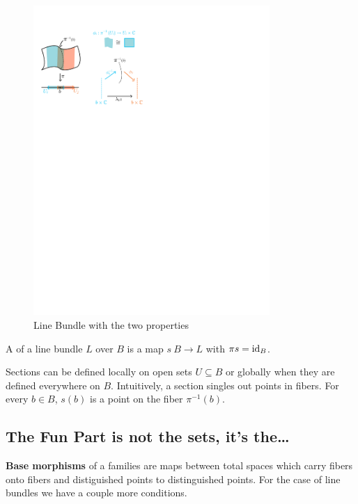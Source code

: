 \documentclass[12pt]{memoir}
\begin{document}
\begin{figure}[h!]
    \centering
    \includegraphics[width=0.8\textwidth, trim= 0.725cm 19.25cm 11.625cm 2.25cm,clip]{figs/figLineBundleDefn.pdf}
    \caption{Line Bundle with the two properties}
    \label{fig:2.1-LineBdlExample}
\end{figure} 

\begin{Def}
    A  of a line bundle $L$ over $B$ is a map $s\:B\to L$ with $\pi s=\operatorname{id}_B$. 
\end{Def}

Sections can be defined locally on open sets $U\subseteq B$ or globally when they are defined everywhere on $B$. Intuitively, a section singles out points in fibers. For every $b\in B$, $s(b)$ is a point on the fiber $\pi^{-1}(b)$.
\subsection*{The Fun Part is not the sets, it's the\dots}

\textbf{Base morphisms} of a families are maps between total spaces which carry fibers onto fibers and distiguished points to distinguished points. For the case of line bundles we have a couple more conditions.
\end{document}
